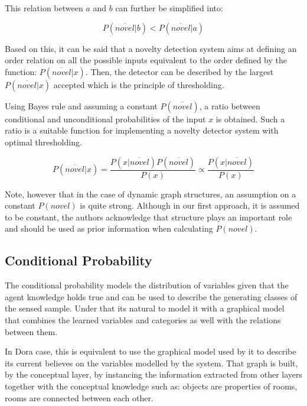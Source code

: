 \documentclass[runningheads,a4paper]{llncs}
\begin{document}
This relation between $a$ and $b$ can further be simplified into:

\begin{equation}
P(\overline{novel}|b) < P(\overline{novel}|a)
\end{equation}

Based on this, it can be said that a novelty detection system aims at 
defining an order relation on all the possible inputs equivalent
to the order defined by the function: $P(\overline{novel}|x)$.
Then, the detector can be described by the largest $P(\overline{novel}|x)$ accepted which is the principle of thresholding.

Using Bayes rule and assuming a constant $P(\overline{novel})$,
a ratio between conditional and unconditional probabilities of the input $x$ is obtained.
Such a ratio is a suitable function for implementing a novelty detector system with optimal
thresholding.

\begin{equation}
\label{eq:novelty-threshold}
          P(\overline{novel}|x)
  =       \frac{P(x|\overline{novel}) P(\overline{novel})}{P(x)}
  \propto \frac{P(x|\overline{novel})}{P(x)}
\end{equation}

Note, however that in the case of dynamic graph structures, an assumption on a constant
$P(novel)$ is quite strong. Although in our first approach, it is assumed to be
constant, the authors acknowledge that structure plays an important role and should
be used as prior information when calculating $P(novel)$.

\subsection{Conditional Probability}
\label{sec:conditional-prob}
The conditional probability models the distribution of variables given that the agent
knowledge holds true and can be used to describe the generating classes of the sensed
sample.
Under that its natural to model it with a graphical model that combines the learned
variables and categories as well with the relations between them.

In Dora case, this is equivalent to use the graphical model used by it to describe its
current believes on the variables modelled by the system.
That graph is built, by the conceptual layer, by instancing the information extracted from
other layers together with the conceptual knowledge such as: objects are properties of rooms,
rooms are connected between each other.
\end{document}

